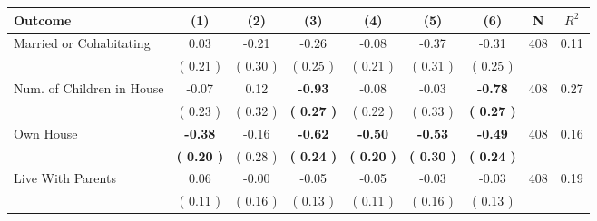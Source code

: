 \begin{tabular}{lcccccccc}
\toprule
 \textbf{Outcome} & \textbf{(1)} & \textbf{(2)} & \textbf{(3)} & \textbf{(4)} & \textbf{(5)} & \textbf{(6)} & \textbf{N} & \textbf{$ R^2$} \\
\midrule
Married or Cohabitating &      0.03 &     -0.21 &     -0.26 &     -0.08 &     -0.37 &     -0.31 & 408 &       0.11 \\ 
 & (     0.21 ) & (     0.30 ) & (     0.25 ) & (     0.21 ) & (     0.31 ) & (     0.25 ) & \\
Num. of Children in House &     -0.07 &      0.12 & \textbf{    -0.93} &     -0.08 &     -0.03 & \textbf{    -0.78} & 408 &       0.27 \\ 
 & (     0.23 ) & (     0.32 ) & \textbf{(     0.27 )} & (     0.22 ) & (     0.33 ) & \textbf{(     0.27 )} & \\
Own House & \textbf{    -0.38} &     -0.16 & \textbf{    -0.62} & \textbf{    -0.50} & \textbf{    -0.53} & \textbf{    -0.49} & 408 &       0.16 \\ 
 & \textbf{(     0.20 )} & (     0.28 ) & \textbf{(     0.24 )} & \textbf{(     0.20 )} & \textbf{(     0.30 )} & \textbf{(     0.24 )} & \\
Live With Parents &      0.06 &     -0.00 &     -0.05 &     -0.05 &     -0.03 &     -0.03 & 408 &       0.19 \\ 
 & (     0.11 ) & (     0.16 ) & (     0.13 ) & (     0.11 ) & (     0.16 ) & (     0.13 ) & \\
\bottomrule
\end{tabular}
